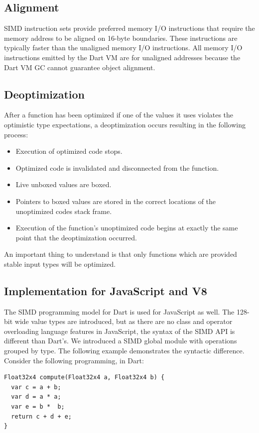 \documentclass[preprint]{sigplanconf}
\begin{document}
\subsection{Alignment}
SIMD instruction sets provide preferred memory I/O instructions that require the memory address to be aligned on 16-byte boundaries. These instructions are typically faster than the unaligned memory I/O instructions. All memory I/O instructions emitted by the Dart VM are for unaligned addresses because the Dart VM GC cannot guarantee object alignment.

\subsection{Deoptimization}
\label{deoptimizing}
After a function has been optimized if one of the values it uses violates the optimistic type expectations, a deoptimization occurs resulting in the following process:

\begin{itemize}
\item Execution of optimized code stops.
\item Optimized code is invalidated and disconnected from the function.
\item Live unboxed values are boxed.
\item Pointers to boxed values are stored in the correct locations of the unoptimized codes stack frame.
\item Execution of the function's unoptimized code begins at exactly the same point that the deoptimization occurred.
\end{itemize}

An important thing to understand is that only functions which are provided stable input types will be optimized. 

\subsection{Implementation for JavaScript and V8}
\label{V8}
The SIMD programming model for Dart is used for JavaScript as well. The 128-bit wide value types are introduced, but as there are no class and operator overloading language features in JavaScript, the syntax of the SIMD API is different than Dart's. We introduced a SIMD global module with operations grouped by type. The following example demonstrates the syntactic difference. Consider the following programming, in Dart:

\begin{verbatim}
Float32x4 compute(Float32x4 a, Float32x4 b) {
  var c = a + b;
  var d = a * a;
  var e = b *  b;
  return c + d + e;
}
\end{verbatim}
\end{document}
